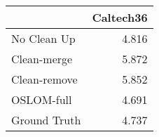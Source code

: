 \begin{tabular}{lr}
\toprule
{} & Caltech36 \\
\midrule
No Clean Up  &     4.816 \\
Clean-merge  &     5.872 \\
Clean-remove &     5.852 \\
OSLOM-full   &     4.691 \\
Ground Truth &     4.737 \\
\bottomrule
\end{tabular}

